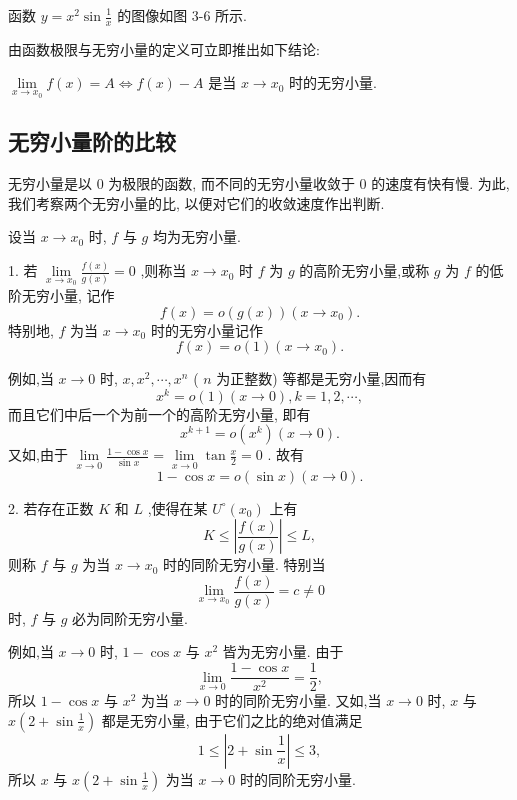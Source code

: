 函数 \(y = {x}^{2}\sin \frac{1}{x}\) 的图像如图 3-6 所示.

由函数极限与无穷小量的定义可立即推出如下结论:

\(\mathop{\lim }\limits_{{x \rightarrow  {x}_{0}}}f\left( x\right)  = A \Leftrightarrow  f\left( x\right)  - A\) 是当 \(x \rightarrow  {x}_{0}\) 时的无穷小量.

\subsection{无穷小量阶的比较}

无穷小量是以 0 为极限的函数, 而不同的无穷小量收敛于 0 的速度有快有慢. 为此, 我们考察两个无穷小量的比, 以便对它们的收敛速度作出判断.

设当 \(x \rightarrow  {x}_{0}\) 时, \(f\) 与 \(g\) 均为无穷小量.

1. 若 \(\mathop{\lim }\limits_{{x \rightarrow  {x}_{0}}}\frac{f\left( x\right) }{g\left( x\right) } = 0\) ,则称当 \(x \rightarrow  {x}_{0}\) 时 \(f\) 为 \(g\) 的高阶无穷小量,或称 \(g\) 为 \(f\) 的低阶无穷小量, 记作
\[
f\left( x\right)  = o\left( {g\left( x\right) }\right) \left( {x \rightarrow  {x}_{0}}\right) .
\]
特别地, \(f\) 为当 \(x \rightarrow  {x}_{0}\) 时的无穷小量记作
\[
f\left( x\right)  = o\left( 1\right) \left( {x \rightarrow  {x}_{0}}\right) .
\]

例如,当 \(x \rightarrow  0\) 时, \(x,{x}^{2},\cdots ,{x}^{n}\) ( \(n\) 为正整数) 等都是无穷小量,因而有
\[
{x}^{k} = o\left( 1\right) \left( {x \rightarrow  0}\right) ,k = 1,2,\cdots ,
\]
而且它们中后一个为前一个的高阶无穷小量, 即有
\[
{x}^{k + 1} = o\left( {x}^{k}\right) \left( {x \rightarrow  0}\right) .
\]
又如,由于 \(\mathop{\lim }\limits_{{x \rightarrow  0}}\frac{1 - \cos x}{\sin x} = \mathop{\lim }\limits_{{x \rightarrow  0}}\tan \frac{x}{2} = 0\) . 故有
\[
1 - \cos x = o\left( {\sin x}\right) \left( {x \rightarrow  0}\right) .
\]

2. 若存在正数 \(K\) 和 \(L\) ,使得在某 \({U}^{ \circ  }\left( {x}_{0}\right)\) 上有
\[
K \leq  \left| \frac{f\left( x\right) }{g\left( x\right) }\right|  \leq  L,
\]
则称 \(f\) 与 \(g\) 为当 \(x \rightarrow  {x}_{0}\) 时的同阶无穷小量. 特别当
\[
\mathop{\lim }\limits_{{x \rightarrow  {x}_{0}}}\frac{f\left( x\right) }{g\left( x\right) } = c \neq  0
\]
时, \(f\) 与 \(g\) 必为同阶无穷小量.

例如,当 \(x \rightarrow  0\) 时, \(1 - \cos x\) 与 \({x}^{2}\) 皆为无穷小量. 由于
\[
\mathop{\lim }\limits_{{x \rightarrow  0}}\frac{1 - \cos x}{{x}^{2}} = \frac{1}{2},
\]
所以 \(1 - \cos x\) 与 \({x}^{2}\) 为当 \(x \rightarrow  0\) 时的同阶无穷小量. 又如,当 \(x \rightarrow  0\) 时, \(x\) 与 \(x\left( {2 + \sin \frac{1}{x}}\right)\) 都是无穷小量, 由于它们之比的绝对值满足
\[
1 \leq  \left| {2 + \sin \frac{1}{x}}\right|  \leq  3,
\]
所以 \(x\) 与 \(x\left( {2 + \sin \frac{1}{x}}\right)\) 为当 \(x \rightarrow  0\) 时的同阶无穷小量.

